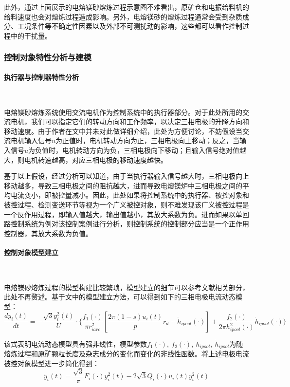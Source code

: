 \documentclass[UTF8, 12pt]{article}
\begin{document}
此外，通过上面展示的电熔镁砂熔炼过程示意图不难看出，原矿仓和电振给料机的给料速度也会对熔炼过程造成影响。另外，电熔镁砂的熔炼过程通常会受到杂质成分、工况条件等不确定性因素以及外部不可测扰动的影响，这些都可以看作控制过程中的干扰量。


\subsubsection{控制对象特性分析与建模}

\paragraph{执行器与控制器特性分析}~{}

电熔镁砂熔炼系统使用交流电机作为控制系统中的执行器部分。对于此处所用的交流电机，我们可以指定它们的转动方向和工作频率，以决定三相电极的升降方向和移动速度。由于作者在文中并未对此做详细介绍，此处为方便讨论，不妨假设当交流电机输入信号$u$为正值时，电机转动方向为正，三相电极向上移动；反之，当输入信号$u$为负值时，电机转动方向为负，三相电极向下移动；且输入信号绝对值越大，则电机转速越高，对应三相电极的移动速度越快。

基于以上假设，经过分析可以知道，由于当执行器输入信号越大时，三相电极向上移动越多，导致三相电极之间的阻抗越大，进而导致电熔镁炉中三相电极之间的平均电流变小，即被控量减小。因此，此处如果将控制系统中的执行器、被控对象和被控过程、检测变送环节等视为一个广义被控对象，则不难发现该广义被控过程是一个反作用过程，即输入值越大，输出值越小，其放大系数为负。进而如果以单回路控制系统为例对该控制案例进行分析，则控制系统的控制部分应当是一个正作用控制器，其放大系数为负值。

\paragraph{控制对象模型建立}~{}

电熔镁砂熔炼过程的模型构建比较繁琐，模型建立的细节可以参考文献相关部分，此处不再赘述。基于文中的模型建立方法，可以得到如下的三相电极电流动态模型：
\begin{equation*}
	\frac{d y_i(t)}{dt} = -\frac{\sqrt{3}y_i^2(t)}{U} \cdot \{ \frac{f_1(\cdot)}{\pi r_{iarc}^2}[\frac{2\pi(1-s)u_i(t)}{p}r_d - \dot{h}_{ipool}(\cdot)] + \frac{f_2(\cdot)}{2\pi h_{ipool}^2(\cdot)}\dot{h}_{ipool}(\cdot) \}
\end{equation*}

该式表明电流动态模型具有强非线性，模型参数$f_1(\cdot),\ f_2(\cdot),\ h_{ipool},\ \dot{h}_{ipool}$为随熔炼过程和原矿颗粒长度及杂志成分的变化而变化的非线性函数。将上述电极电流被控对象模型进一步简化得到：
\begin{equation*}
	\dot{y}_i(t) = \frac{\sqrt{3}}{\pi}F_i(\cdot)y^2_i(t) - 2\sqrt{3}Q_i(\cdot)u_i(t)y_i^2(t)
\end{equation*}
\end{document}
